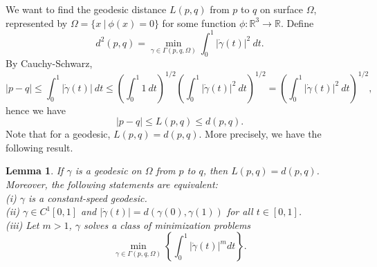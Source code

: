 \documentclass[12pt]{amsart}
\newcommand{\R}{\mathbb{R}}
\newtheorem{lemma}[theorem]{Lemma}
\theoremstyle{definition}
\theoremstyle{remark}
\numberwithin{equation}{section}
\numberwithin{equation}{section}
\begin{document}
We want to find the geodesic distance $L(p,q)$ from $p$ to $q$ on surface $\Omega$, represented by $\Omega = \{x~|~ \phi(x) = 0\}$ for some function $\phi: \R^3 \to \R$. Define
\[d^2(p,q) = \min_{\gamma \in \Gamma(p, q, \Omega)}\int_0^1 |\dot{\gamma}(t)|^2~dt.
\]
By Cauchy-Schwarz, 
\[
|p-q| \leq \int_0^1 |\dot{\gamma}(t)|~dt \leq \left(\int_0^1 1~dt\right)^{1/2}\left(\int_0^1 |\dot{\gamma}(t)|^2~dt\right)^{1/2} = \left( \int_0^1 |\dot{\gamma}(t)|^2~dt\right)^{1/2},\] 
hence we have 
$$
|p-q|\leq L(p, q)\leq d(p, q). 
$$
Note that for a geodesic, $L(p, q)=d(p, q)$.  More precisely, we have the following result. 
\begin{lemma}
  If $\gamma$ is a geodesic on $\Omega$ from $p$ to $q$, then $L(p,q) = d(p,q)$.
 Moreover, the following statements are equivalent:\\
(i) $\gamma$ is a constant-speed geodesic. \\ 
(ii) $\gamma \in C^1[0, 1]$ and $|\dot \gamma(t)| = d(\gamma(0), \gamma(1))$ for all $t \in[0, 1]$. \\
(iii) Let $m>1$, $\gamma$ solves a class of minimization problems 
$$
\min_{\gamma \in \Gamma(p, q, \Omega)} \left\{ 
\int_0^1 |\dot \gamma(t)|^m dt\right\}.
$$
\end{lemma}
\end{document}
